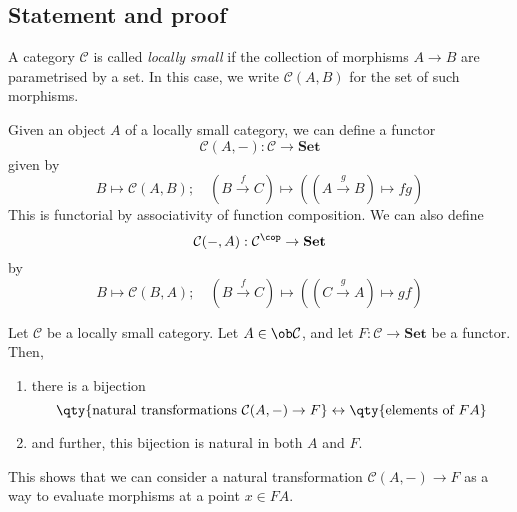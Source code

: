 \subsection{Statement and proof}
\begin{definition}
    A category \( \mathcal C \) is called \emph{locally small} if the collection of morphisms \( A \to B \) are parametrised by a set.
    In this case, we write \( \mathcal C(A, B) \) for the set of such morphisms.
\end{definition}
Given an object \( A \) of a locally small category, we can define a functor
\[ \mathcal C(A, -) : \mathcal C \to \mathbf{Set} \]
given by
\[ B \mapsto \mathcal C(A, B);\quad (B \xrightarrow f C) \mapsto ((A \xrightarrow g B) \mapsto f g) \]
This is functorial by associativity of function composition.
We can also define
\[ \mathcal C(-, A) : \mathcal C^\cop \to \mathbf{Set} \]
by
\[ B \mapsto \mathcal C(B, A);\quad (B \xrightarrow f C) \mapsto ((C \xrightarrow g A) \mapsto g f) \]
\begin{lemma}
    Let \( \mathcal C \) be a locally small category.
    Let \( A \in \ob \mathcal C \), and let \( F : \mathcal C \to \mathbf{Set} \) be a functor.
    Then,
    \begin{enumerate}
        \item there is a bijection
        \[ \qty{\text{natural transformations } \mathcal C(A, -) \to F} \leftrightarrow \qty{\text{elements of } F A} \]
        \item and further, this bijection is natural in both \( A \) and \( F \).
    \end{enumerate}
\end{lemma}
This shows that we can consider a natural transformation \( \mathcal C(A, -) \to F \) as a way to evaluate morphisms at a point \( x \in F A \).
